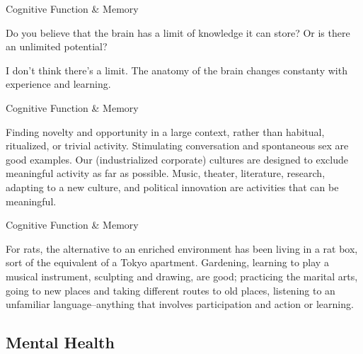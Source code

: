\documentclass[11pt,oneside,openany,extrafontsizes]{memoir}
\begin{document}
\begin{qaexchange}{Cognitive Function \& Memory}

    \begin{question}
        Do you believe that the brain has a limit of knowledge it can store? Or is there an unlimited potential? 
    \end{question}

    \begin{answer}
      I don't think there's a limit. The anatomy of the brain changes constanty with experience and learning.
    \end{answer}
\end{qaexchange}

\begin{standalonequote}{Cognitive Function \& Memory}

    \begin{answer}
      Finding novelty and opportunity in a large context, rather than habitual, ritualized, or trivial activity. Stimulating conversation and spontaneous sex are good examples. Our (industrialized corporate) cultures are designed to exclude meaningful activity as far as possible. Music, theater, literature, research, adapting to a new culture, and political innovation are activities that can be meaningful.
    \end{answer}
\end{standalonequote}

\begin{standalonequote}{Cognitive Function \& Memory}

    \begin{answer}
      For rats, the alternative to an enriched environment has been living in a rat box, sort of the equivalent of a Tokyo apartment. Gardening, learning to play a musical instrument, sculpting and drawing, are good; practicing the marital arts, going to new places and taking different routes to old places, listening to an unfamiliar language--anything that involves participation and action or learning.

    \end{answer}
\end{standalonequote}

\subsection{Mental Health}
\end{document}
